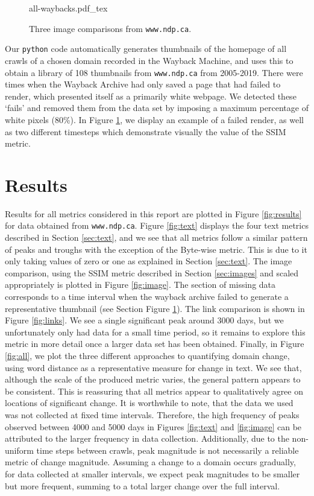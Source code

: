 \documentclass[10pt, a4paper]{article}
\begin{document}
\begin{figure}[h!]
\centering
\def\svgwidth{
0.7\columnwidth}
{all-waybacks.pdf_tex}
  \caption{Three image comparisons from \texttt{www.ndp.ca}.}
\label{fig::wayback_images}
\end{figure}

 Our \texttt{python} code automatically generates thumbnails of the homepage of all crawls of a chosen domain recorded in the Wayback Machine, and uses this to obtain a library of 108 thumbnails from \texttt{www.ndp.ca} from 2005-2019.
 There were times when the Wayback Archive had only saved a page that had failed to render, which presented itself as a primarily white webpage.
 We detected these `fails' and removed them from the data set by imposing a maximum percentage of white pixels (80\%).
 In Figure \ref{fig::wayback_images}, we display an example of a failed render, as well as two different timesteps which demonstrate visually the value of the SSIM metric.
\vspace{-3mm}

\section{Results}

 Results for all metrics considered in this report are plotted in Figure \ref{fig:results} for data obtained from \texttt{www.ndp.ca}.
 Figure \ref{fig:text} displays the four text metrics described in Section \ref{sec:text}, and we see that all metrics follow a similar pattern of peaks and troughs with the exception of the Byte-wise metric.
 This is due to it only taking values of zero or one as explained in Section \ref{sec:text}.
 The image comparison, using the SSIM metric described in Section \ref{sec:images} and scaled appropriately is plotted in Figure \ref{fig:image}.
 The section of missing data corresponds to a time interval when the wayback archive failed to generate a representative thumbnail (see Section Figure \ref{fig::wayback_images}).
 The link comparison is shown in Figure \ref{fig:links}.
 We see a single significant peak around 3000 days, but we unfortunately only had data for a small time period, so it remains to explore this metric in more detail once a larger data set has been obtained.
 Finally, in Figure \ref{fig:all}, we plot the three different approaches to quantifying domain change, using word distance as a representative measure for change in text.
 We see that, although the scale of the produced metric varies, the general pattern appears to be consistent.
 This is reassuring that all metrics appear to qualitatively agree on locations of significant change.
 It is worthwhile to note, that the data we used was not collected at fixed time intervals.
 Therefore, the high frequency of peaks observed between 4000 and 5000 days in Figures \ref{fig:text} and \ref{fig:image} can be attributed to the larger frequency in data collection.
 Additionally, due to the non-uniform time steps between crawls, peak magnitude is not necessarily a reliable metric of change magnitude.
 Assuming a change to a domain occurs gradually, for data collected at smaller intervals, we expect peak magnitudes to be smaller but more frequent, summing to a total larger change over the full interval. 
\end{document}
